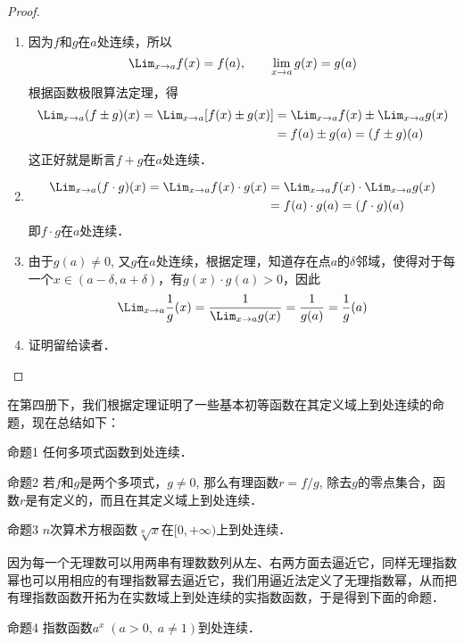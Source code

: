 \begin{proof}
\begin{enumerate}
    \item 因为$f$和$g$在$a$处连续，所以
    \[\Lim_{x\to a} f (x) =f (a) ,\qquad  \lim_{x\to a} g (x) =g (a)\]
    根据函数极限算法定理，得
   \[\begin{split}
    \Lim_{x\to a} (f\pm g)(x)=\Lim_{x\to a}[f(x)\pm g(x)]&=\Lim_{x\to a} f(x)\pm \Lim_{x\to a}g(x)\\
    &=f(a)\pm g(a)=(f\pm g)(a)
   \end{split} \]
    这正好就是断言$f+g$在$a$处连续．
    \item \[\begin{split}
        \Lim_{x\to a} (f\cdot g) (x)=\Lim_{x\to a}f(x)\cdot g(x)&=\Lim_{x\to a} f(x)\cdot\Lim_{x\to a}g (x)\\
        &=f (a) \cdot g (a) =(f\cdot g) (a) 
    \end{split}\]
    即$f\cdot g$在$a$处连续．
    \item 由于$g(a)\ne 0$, 又$g$在$a$处连续，根据定理，知道存在点$a$的$\delta$邻域，使得对于每一个$x\in (a-\delta,a+\delta)$，有$g(x)\cdot g(a)>0$，因此
\[\Lim_{x\to a} \frac{1}{g}(x)=\frac{1}{\Lim_{x\to a} g(x)}=\frac{1}{g(a)}=\frac{1}{g}(a)\]

\item 证明留给读者．
\end{enumerate} 
\end{proof}

在第四册下，我们根据定理证明了一些基本初等函数在其定义域上到处连续的命题，现在总结如下：

\begin{blk}
   {命题1} 任何多项式函数到处连续． 
\end{blk}

\begin{blk}{命题2}
    若$f$和$g$是两个多项式，$g\ne 0$, 那么有理函数$r=f/g$, 除去$g$的零点集合，函数$r$是有定义的，而且在其定义域上到处连续．
\end{blk}

\begin{blk}
   {命题3} $n$次算术方根函数$\sqrt[n]{x}$在$[0,+\infty)$上到处连续．
\end{blk}

因为每一个无理数可以用两串有理数数列从左、右两方面去逼近它，同样无理指数幂也可以用相应的有理指数幂去逼近它，我们用逼近法定义了无理指数幂，从而把有理指数函数开拓为在实数域上到处连续的实指数函数，于是得到下面的命题． 

\begin{blk}
    {命题4} 指数函数$a^x\; (a>0,\; a\ne 1)$到处连续．
\end{blk}

